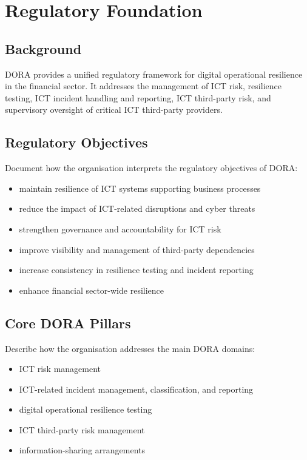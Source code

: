 \documentclass[
  letterpaper,
  DIV=11,
  numbers=noendperiod]{scrartcl}
\providecommand{\tightlist}{%
  \setlength{\itemsep}{0pt}\setlength{\parskip}{0pt}}
\begin{document}
\section{Regulatory Foundation}\label{regulatory-foundation}

\subsection{Background}\label{background}

DORA provides a unified regulatory framework for digital operational
resilience in the financial sector. It addresses the management of ICT
risk, resilience testing, ICT incident handling and reporting, ICT
third-party risk, and supervisory oversight of critical ICT third-party
providers.

\subsection{Regulatory Objectives}\label{regulatory-objectives}

Document how the organisation interprets the regulatory objectives of
DORA:

\begin{itemize}
\tightlist
\item
  maintain resilience of ICT systems supporting business processes
\item
  reduce the impact of ICT-related disruptions and cyber threats
\item
  strengthen governance and accountability for ICT risk
\item
  improve visibility and management of third-party dependencies
\item
  increase consistency in resilience testing and incident reporting
\item
  enhance financial sector-wide resilience
\end{itemize}

\subsection{Core DORA Pillars}\label{core-dora-pillars}

Describe how the organisation addresses the main DORA domains:

\begin{itemize}
\tightlist
\item
  ICT risk management
\item
  ICT-related incident management, classification, and reporting
\item
  digital operational resilience testing
\item
  ICT third-party risk management
\item
  information-sharing arrangements
\end{itemize}
\end{document}
